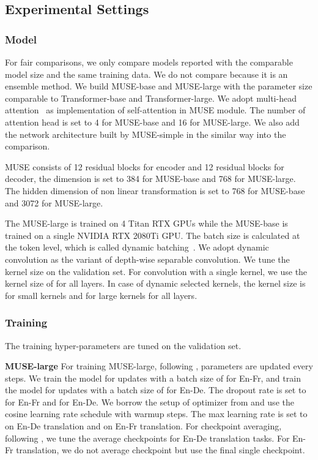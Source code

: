 \documentclass{article} \usepackage{iclr2020_conference,times}
\begin{document}
\subsection{Experimental Settings}
\subsubsection{Model}
For fair comparisons, we only compare models reported with the comparable model size and the same training data. We do not compare \citet{Wu_2019} because it is an  ensemble method. We build MUSE-base and MUSE-large with the parameter size  comparable to Transformer-base and Transformer-large. We adopt multi-head attention~\citep{vaswani2017attention} as implementation of self-attention in MUSE module. The number of attention head is set to 4 for MUSE-base and 16 for MUSE-large. We also add the network architecture built by MUSE-simple  in the similar way into the comparison.

MUSE consists of 12 residual blocks for encoder and 12 residual blocks for decoder, the dimension is set to 384 for MUSE-base and 768 for MUSE-large. The hidden dimension of non linear transformation is set to 768 for MUSE-base and 3072 for MUSE-large.



The MUSE-large is trained on 4 Titan RTX GPUs while the MUSE-base is trained on a single NVIDIA RTX 2080Ti GPU. The batch size  is calculated at the token level, which is called dynamic batching~\citep{vaswani2017attention}. 
We adopt dynamic convolution as the variant of depth-wise separable convolution. We tune the kernel size on the validation set. For convolution with a single kernel, we use the kernel size of  for all layers. In case of dynamic selected kernels, the kernel size is  for small kernels and  for large kernels for all layers. 


\subsubsection{Training}
The training hyper-parameters are tuned on the validation set. 

\textbf{MUSE-large}
For training MUSE-large, following \citet{ott2018scaling}, parameters are updated every  steps. We train the model for  updates with a batch size of  for En-Fr, and train the model for  updates with a batch size of  for En-De. The dropout rate is set to  for En-Fr and  for En-De. We borrow the  setup of optimizer from \citet{wu2019pay} and use the cosine learning rate schedule with  warmup steps. The max learning rate is set to  on  En-De translation and  on En-Fr translation. For checkpoint averaging, following \citet{wu2019pay}, we tune the average checkpoints for En-De translation tasks. For En-Fr translation, we do not average checkpoint but use the final single checkpoint.
\end{document}
